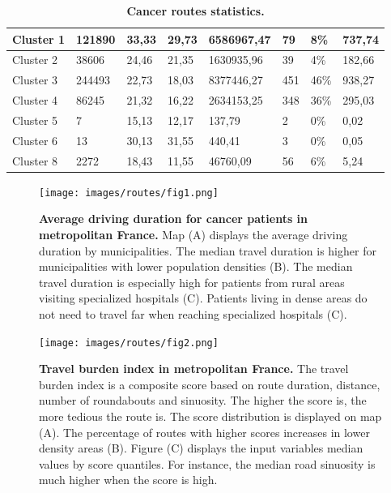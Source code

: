 \begin{table}[H]
{\begin{tabular}{|l|l|l|l|l|l|l|l|}
            Cluster 1 & 121890 & 33,33 & 29,73 & 6586967,47 & 79 & 8\% & 737,74 \\ \hline
            Cluster 2 & 38606 & 24,46 & 21,35 & 1630935,96 & 39 & 4\% & 182,66 \\ \hline
            Cluster 3 & 244493 & 22,73 & 18,03 & 8377446,27 & 451 & 46\% & 938,27 \\ \hline
            Cluster 4 & 86245 & 21,32 & 16,22 & 2634153,25 & 348 & 36\% & 295,03 \\ \hline
            Cluster 5 & 7 & 15,13 & 12,17 & 137,79 & 2 & 0\% & 0,02 \\ \hline
            Cluster 6 & 13 & 30,13 & 31,55 & 440,41 & 3 & 0\% & 0,05 \\ \hline
            Cluster 8 & 2272 & 18,43 & 11,55 & 46760,09 & 56 & 6\% & 5,24 \\ \hline
        \end{tabular}
    }
    \caption{
        \textbf{Cancer routes statistics.}
    }
    \label{table:distance_and_co2}
\end{table}

\begin{figure}[H]
    \texttt{[image: images/routes/fig1.png]}
    \centering
    \caption{
        \textbf{Average driving duration for cancer patients in metropolitan France.} Map (A) displays the average driving duration by municipalities. The median travel duration is higher for municipalities with lower population densities (B). The median travel duration is especially high for patients from rural areas visiting specialized hospitals (C). Patients living in dense areas do not need to travel far when reaching specialized hospitals (C).
    }
    \label{fig:routes-duration-france}
\end{figure}

\begin{figure}[H]
    \texttt{[image: images/routes/fig2.png]}
    \centering
    \caption{
        \textbf{Travel burden index in metropolitan France.} The travel burden index is a composite score based on route duration, distance, number of roundabouts and sinuosity. The higher the score is, the more tedious the route is. The score distribution is displayed on map (A). The percentage of routes with higher scores increases in lower density areas (B). Figure (C) displays the input variables median values by score quantiles. For instance, the median road sinuosity is much higher when the score is high.
    }
    \label{fig:routes-burden-index}
\end{figure}

